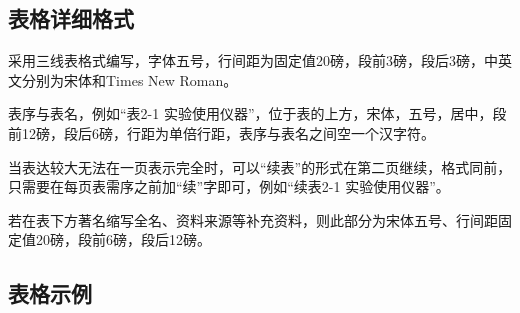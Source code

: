 \subsection{表格详细格式}

采用三线表格式编写，字体五号，行间距为固定值20磅，段前3磅，段后3磅，中英文分别为宋体和Times New Roman。

表序与表名，例如“表2-1 实验使用仪器”，位于表的上方，宋体，五号，居中，段前12磅，段后6磅，行距为单倍行距，表序与表名之间空一个汉字符。

当表达较大无法在一页表示完全时，可以“续表”的形式在第二页继续，格式同前，只需要在每页表需序之前加“续”字即可，例如“续表2-1 实验使用仪器”。

若在表下方著名缩写全名、资料来源等补充资料，则此部分为宋体五号、行间距固定值20磅，段前6磅，段后12磅。

\subsection{表格示例}


